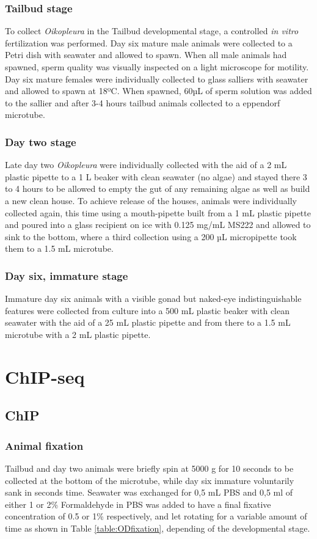 \documentclass[11pt,twoside,a4paper]{report}
\begin{document}
			\subsubsection{Tailbud stage}
			To collect \textit{Oikopleura} in the Tailbud developmental stage, a controlled \textit{in vitro} fertilization was performed. Day six mature male animals were collected to a Petri dish with seawater and allowed to spawn. When all male animals had spawned, sperm quality was visually inspected on a light microscope for motility. Day six mature females were individually collected to glass salliers with seawater and allowed to spawn at 18ºC. When spawned, 60µL of sperm solution was added to the sallier and after 3-4 hours tailbud animals collected to a eppendorf microtube.
			
			\subsubsection{Day two stage}
			Late day two \textit{Oikopleura} were individually collected with the aid of a 2 mL plastic pipette to a 1 L beaker with clean seawater (no algae) and stayed there 3 to 4 hours to be allowed to empty the gut of any remaining algae as well as build a new clean house.
			To achieve release of the houses, animals were individually collected again, this time using a mouth-pipette built from a 1 mL plastic pipette and poured into a glass recipient on ice with 0.125 mg/mL MS222 and allowed to sink to the bottom, where a third collection using a 200 µL micropipette took them to a 1.5 mL microtube.
			
			\subsubsection{Day six, immature stage}
			Immature day six animals with a visible gonad but naked-eye indistinguishable features were collected from culture into a 500 mL plastic beaker with clean seawater with the aid of a 25 mL plastic pipette and from there to a 1.5 mL microtube with a 2 mL plastic pipette. 
		
	
	\section{ChIP-seq}
		\subsection{ChIP}
			\subsubsection{Animal fixation}
			Tailbud and day two animals were briefly spin at 5000 g for 10 seconds to be collected at the bottom of the microtube, while day six immature voluntarily sank in seconds time. Seawater was exchanged for 0,5 mL PBS and 0,5 ml of either 1 or 2\% Formaldehyde in PBS was added to have a final fixative concentration of 0.5 or 1\% respectively, and let rotating for a variable amount of time as shown in Table \ref{table:ODfixation}, depending of the developmental stage. %
			
\end{document}
